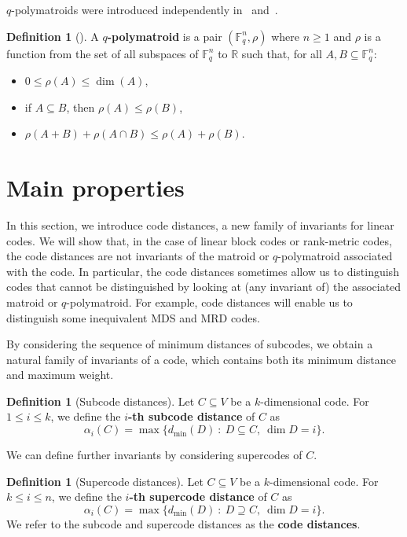 \documentclass[12pt]{amsart}
\numberwithin{equation}{section}
\theoremstyle{definition}
\newtheorem{definition}[theorem]{Definition}
\newcommand{\FF}{\mathbb{F}}
\begin{document}
$q$-polymatroids were introduced independently in~\cite{GJLR20} and~\cite{S19}. 

\begin{definition}[{\cite[Definition 4.1]{GJLR20}}]
A \textbf{$q$-polymatroid} is a pair $(\FF_q^n,\rho)$ where $n \ge 1$ and $\rho$ is a function from the set of all subspaces of $\FF_q^n$ to $\mathbb{R}$ such that, for all $A,B\subseteq \FF_q^n$:
\begin{itemize} \setlength\itemsep{0em}
\item[(P1)] $0\leq \rho(A)\leq\dim(A)$,
\item[(P2)] if $A\subseteq B$, then $\rho(A)\leq \rho(B)$,
\item[(P3)] $\rho(A+B)+\rho(A\cap B)\leq \rho(A)+\rho(B)$.
\end{itemize}
\end{definition}


\section{Main properties}\label{main}

In this section, we introduce code distances, a new family of invariants for linear codes. We will show that, in the case of linear block codes or rank-metric codes, the code distances are not invariants of the matroid or $q$-polymatroid associated with the code. In particular, the code distances sometimes allow us to distinguish codes that cannot be distinguished by looking at (any invariant of) the associated matroid or $q$-polymatroid. For example, code distances will enable us to distinguish some inequivalent MDS and MRD codes.

By considering the sequence of minimum distances of subcodes, we obtain a natural family of invariants of a code, which contains both its minimum distance and maximum weight.

\begin{definition}[Subcode distances]
Let $C\subseteq V$ be a $k$-dimensional code. For $1\leq i\leq k$, we define the {\bf $i$-th subcode distance} of $C$ as
$$\alpha_i(C)=\max\{d_{\min}(D)\ :\ D\subseteq C,\ \dim D=i\}.$$
\end{definition}

We can define further invariants by considering supercodes of $C$.

\begin{definition}[Supercode distances]
Let $C\subseteq V$ be a $k$-dimensional code. For $k\leq i\leq n$, we define the {\bf $i$-th supercode distance} of $C$ as
$$\alpha_i(C)=\max\{d_{\min}(D)\ :\ D\supseteq C,\ \dim D=i\}.$$
We refer to the subcode and supercode distances as the {\bf code distances}.
\end{definition}
\end{document}
